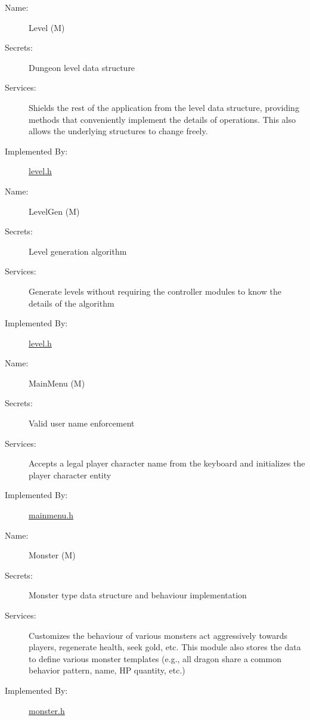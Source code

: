 \documentclass[12pt, titlepage]{article}
\newcounter{mnum}
\newcommand{\mdprint}[1]{\addtocounter{mnum}{1} #1 (M\themnum)}
\begin{document}
        \bigskip\begin{description}
            \item[Name:]\mdprint{Level}
            \item[Secrets:]Dungeon level data structure
            \item[Services:]Shields the rest of the application from the level data structure, providing methods that conveniently implement the details of operations. This also allows the underlying structures to change freely.
            \item[Implemented By:]\href{run:../../../src/include/level.h}{level.h}
        \end{description}

        \bigskip\begin{description}
            \item[Name:]\mdprint{LevelGen}
            \item[Secrets:]Level generation algorithm
            \item[Services:]Generate levels without requiring the controller modules to know the details of the algorithm
            \item[Implemented By:]\href{run:../../../src/include/level.h}{level.h}
        \end{description}

        \bigskip\begin{description}
            \item[Name:]\mdprint{MainMenu}
            \item[Secrets:]Valid user name enforcement
            \item[Services:]Accepts a legal player character name from the keyboard and initializes the player character entity
            \item[Implemented By:]\href{run:../../../src/include/mainmenu.h}{mainmenu.h}
        \end{description}

        \bigskip\begin{description}
            \item[Name:]\mdprint{Monster}
            \item[Secrets:]Monster type data structure and behaviour implementation
            \item[Services:]Customizes the behaviour of various monsters act aggressively towards players, regenerate health, seek gold, etc.  This module also stores the data to define various monster templates (e.g., all dragon share a common behavior pattern, name, HP quantity, etc.)
            \item[Implemented By:]\href{run:../../../src/include/monster.h}{monster.h}
        \end{description}
\end{document}
